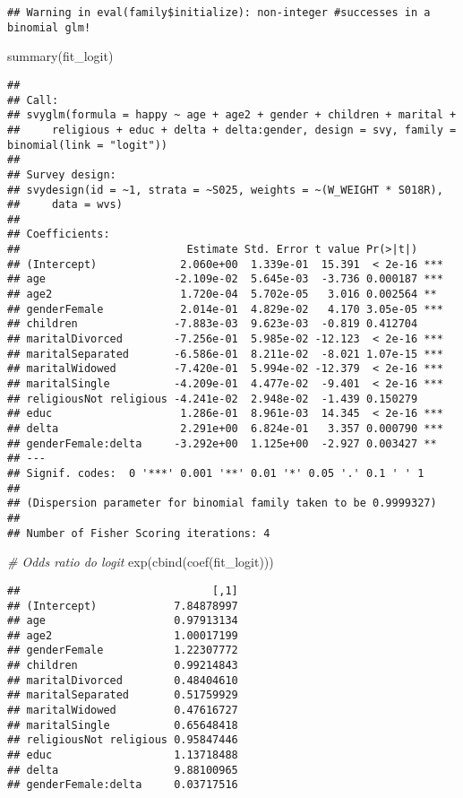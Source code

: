 \documentclass[
]{article}
\newenvironment{Shaded}{\begin{snugshade}}{\end{snugshade}}
\newcommand{\CommentTok}[1]{\textcolor[rgb]{0.56,0.35,0.01}{\textit{#1}}}
\newcommand{\FunctionTok}[1]{\textcolor[rgb]{0.00,0.00,0.00}{#1}}
\newcommand{\NormalTok}[1]{#1}
\begin{document}
\begin{verbatim}
## Warning in eval(family$initialize): non-integer #successes in a binomial glm!
\end{verbatim}

\begin{Shaded}
\begin{Highlighting}[]
\FunctionTok{summary}\NormalTok{(fit\_logit)}
\end{Highlighting}
\end{Shaded}

\begin{verbatim}
## 
## Call:
## svyglm(formula = happy ~ age + age2 + gender + children + marital + 
##     religious + educ + delta + delta:gender, design = svy, family = binomial(link = "logit"))
## 
## Survey design:
## svydesign(id = ~1, strata = ~S025, weights = ~(W_WEIGHT * S018R), 
##     data = wvs)
## 
## Coefficients:
##                          Estimate Std. Error t value Pr(>|t|)    
## (Intercept)             2.060e+00  1.339e-01  15.391  < 2e-16 ***
## age                    -2.109e-02  5.645e-03  -3.736 0.000187 ***
## age2                    1.720e-04  5.702e-05   3.016 0.002564 ** 
## genderFemale            2.014e-01  4.829e-02   4.170 3.05e-05 ***
## children               -7.883e-03  9.623e-03  -0.819 0.412704    
## maritalDivorced        -7.256e-01  5.985e-02 -12.123  < 2e-16 ***
## maritalSeparated       -6.586e-01  8.211e-02  -8.021 1.07e-15 ***
## maritalWidowed         -7.420e-01  5.994e-02 -12.379  < 2e-16 ***
## maritalSingle          -4.209e-01  4.477e-02  -9.401  < 2e-16 ***
## religiousNot religious -4.241e-02  2.948e-02  -1.439 0.150279    
## educ                    1.286e-01  8.961e-03  14.345  < 2e-16 ***
## delta                   2.291e+00  6.824e-01   3.357 0.000790 ***
## genderFemale:delta     -3.292e+00  1.125e+00  -2.927 0.003427 ** 
## ---
## Signif. codes:  0 '***' 0.001 '**' 0.01 '*' 0.05 '.' 0.1 ' ' 1
## 
## (Dispersion parameter for binomial family taken to be 0.9999327)
## 
## Number of Fisher Scoring iterations: 4
\end{verbatim}

\begin{Shaded}
\begin{Highlighting}[]
\CommentTok{\# Odds ratio do logit}
\FunctionTok{exp}\NormalTok{(}\FunctionTok{cbind}\NormalTok{(}\FunctionTok{coef}\NormalTok{(fit\_logit)))}
\end{Highlighting}
\end{Shaded}

\begin{verbatim}
##                              [,1]
## (Intercept)            7.84878997
## age                    0.97913134
## age2                   1.00017199
## genderFemale           1.22307772
## children               0.99214843
## maritalDivorced        0.48404610
## maritalSeparated       0.51759929
## maritalWidowed         0.47616727
## maritalSingle          0.65648418
## religiousNot religious 0.95847446
## educ                   1.13718488
## delta                  9.88100965
## genderFemale:delta     0.03717516
\end{verbatim}
\end{document}

